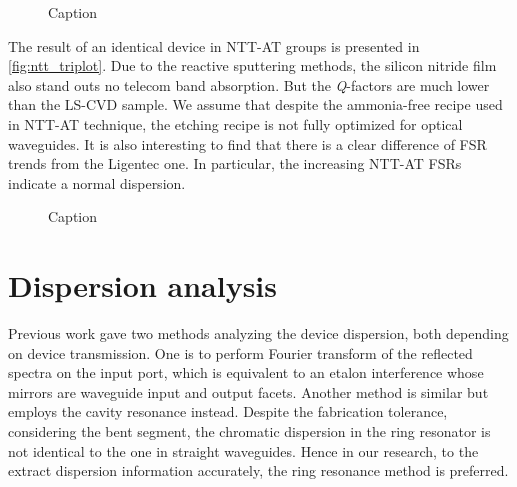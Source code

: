 \begin{figure}
	\centering
	
	\caption{Caption}
	\label{fig:ligentec_gp2}
\end{figure}




%    

The result of an identical device in NTT-AT groups is presented in \autoref{fig:ntt_triplot}. Due to the reactive sputtering methods, the silicon nitride film also stand outs no telecom band absorption. But the \textit{Q}-factors are much lower
 than the LS-CVD sample. 
We assume that despite the ammonia-free recipe used in NTT-AT technique, the etching recipe is not fully optimized for optical waveguides. It is also interesting to find that there is a clear difference of FSR trends from the Ligentec one. In particular, the increasing NTT-AT FSRs indicate a normal dispersion.

\begin{figure}
    \centering
    
    \caption{Caption}
    \label{fig:ntt_triplot}
\end{figure}


\section{Dispersion analysis}

Previous work \cite{Sunada2018} gave two methods analyzing the device dispersion, both depending on device transmission. One is to perform Fourier transform of the reflected spectra on the input port, which is equivalent to an etalon interference whose mirrors are waveguide input and output facets. Another method is similar but employs the cavity resonance instead. Despite the fabrication tolerance, considering the bent segment, the chromatic dispersion in the ring resonator is not identical to the one in straight waveguides. Hence in our research, to the extract dispersion information accurately, the ring resonance method is preferred. 

